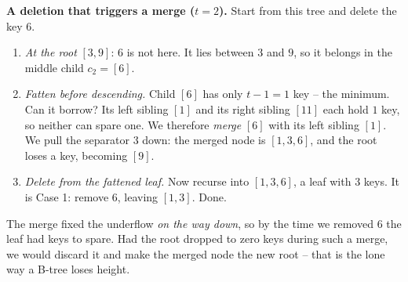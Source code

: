 \begin{labbox}
\textbf{A deletion that triggers a merge ($t = 2$).} Start from this tree and delete
the key $6$.
\begin{center}
\end{center}
\begin{enumerate}
\item \emph{At the root} $[3,9]$: $6$ is not here. It lies between $3$ and $9$, so
it belongs in the middle child $c_2 = [6]$.
\item \emph{Fatten before descending.} Child $[6]$ has only $t-1 = 1$ key -- the
minimum. Can it borrow? Its left sibling $[1]$ and its right sibling $[11]$ each
hold $1$ key, so neither can spare one. We therefore
\emph{merge} $[6]$ with its left sibling $[1]$. We pull the separator $3$ down: the
merged node is $[1,3,6]$, and the root loses a key, becoming $[9]$.
\begin{center}
\end{center}
\item \emph{Delete from the fattened leaf.} Now recurse into $[1,3,6]$, a leaf with
$3$ keys. It is Case 1: remove $6$, leaving $[1,3]$. Done.
\end{enumerate}
\begin{center}
\end{center}
The merge fixed the underflow \emph{on the way down}, so by the time we removed $6$
the leaf had keys to spare. Had the root dropped to zero keys during such a merge,
we would discard it and make the merged node the new root -- that is the lone way a
B-tree loses height.
\end{labbox}

